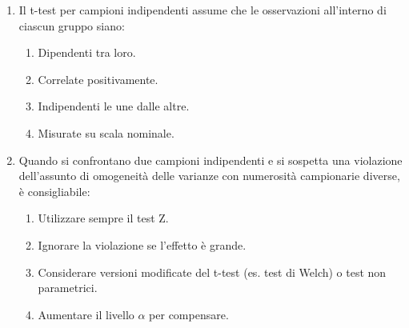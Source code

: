 \documentclass[12pt, a4paper]{article}
\begin{document}
\begin{enumerate}[resume]
    \item Il t-test per campioni indipendenti assume che le osservazioni all'interno di ciascun gruppo siano:
    \begin{enumerate}
        \item Dipendenti tra loro.
        \item Correlate positivamente.
        \item Indipendenti le une dalle altre.
        \item Misurate su scala nominale.
    \end{enumerate}
    \vspace{0.3cm}

    \item Quando si confrontano due campioni indipendenti e si sospetta una violazione dell'assunto di omogeneità delle varianze con numerosità campionarie diverse, è consigliabile:
    \begin{enumerate}
        \item Utilizzare sempre il test Z.
        \item Ignorare la violazione se l'effetto è grande.
        \item Considerare versioni modificate del t-test (es. test di Welch) o test non parametrici.
        \item Aumentare il livello $\alpha$ per compensare.
    \end{enumerate}
    \vspace{0.3cm}
\end{enumerate}

\end{document}
